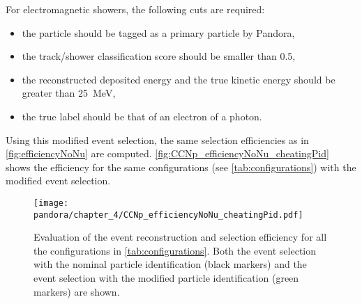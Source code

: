 \noindent
For electromagnetic showers, the following cuts are required: \begin{itemize}
    \item the particle should be tagged as a primary particle by Pandora,
    \item the track/shower classification score should be smaller than 0.5,
    \item the reconstructed deposited energy and the true kinetic energy should be greater than \SI{25}{\MeV},
    \item the true label should be that of an electron of a photon. 
\end{itemize} 

Using this modified event selection, the same selection efficiencies as in \autoref{fig:efficiencyNoNu} are computed. \autoref{fig:CCNp_efficiencyNoNu_cheatingPid} shows the efficiency for the same configurations (see \autoref{tab:configurations}) with the modified event selection. 

\begin{figure}
    \centering
    \texttt{[image: pandora/chapter\_4/CCNp\_efficiencyNoNu\_cheatingPid.pdf]}
    \caption[Evaluation of the reconstruction and selection efficiency for different configurations with the modified event selection]{Evaluation of the event reconstruction and selection efficiency for all the configurations in \autoref{tab:configurations}. Both the event selection with the nominal particle identification (black markers) and the event selection with the modified particle identification (green markers) are shown. }
    \label{fig:CCNp_efficiencyNoNu_cheatingPid}
\end{figure}


